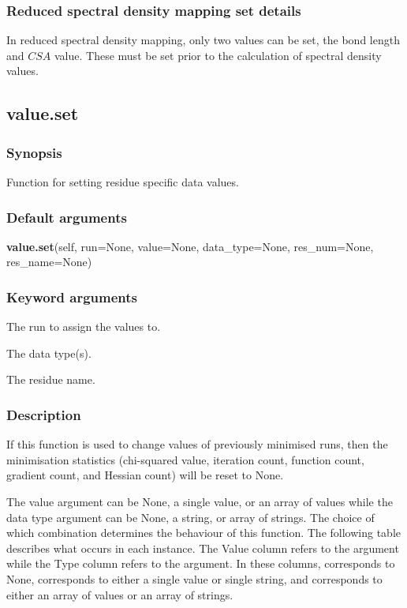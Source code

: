 \subsubsection{Reduced spectral density mapping set details}

In reduced spectral density mapping, only two values can be set, the bond length and $CSA$
value.  These must be set prior to the calculation of spectral density values.


\newpage

\subsection{value.set}


\subsubsection{Synopsis}

Function for setting residue specific data values.

\subsubsection{Default arguments}

\textsf{\textbf{value.set}(self, run=None, value=None, data\_type=None, res\_num=None, res\_name=None)}


\subsubsection{Keyword arguments}

  The run to assign the values to.

  The data type(s).

  The residue name.

\subsubsection{Description}

If this function is used to change values of previously minimised runs, then the
minimisation statistics (chi-squared value, iteration count, function count, gradient count,
and Hessian count) will be reset to None.


The value argument can be None, a single value, or an array of values while the data type
argument can be None, a string, or array of strings.  The choice of which combination
determines the behaviour of this function.  The following table describes what occurs in
each instance.  The Value column refers to the 
 argument while the Type column refers
to the 
 argument.  In these columns, 
 corresponds to None, 
 corresponds
to either a single value or single string, and 
 corresponds to either an array of values
or an array of strings.



